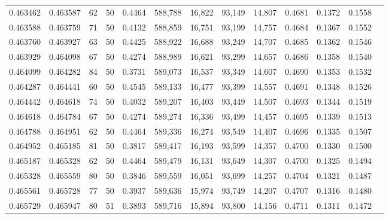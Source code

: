 \begin{tabular}{rrrrrrrrrrrrr}
0.463462 & 0.463587 &    62 &  50 &                                     0.4464 & 588,788 &  16,822 &  93,149 &  14,807 & 0.4681 & 0.1372 & 0.1558 \\
0.463588 & 0.463759 &    71 &  50 &                                     0.4132 & 588,859 &  16,751 &  93,199 &  14,757 & 0.4684 & 0.1367 & 0.1552 \\
0.463760 & 0.463927 &    63 &  50 &                                     0.4425 & 588,922 &  16,688 &  93,249 &  14,707 & 0.4685 & 0.1362 & 0.1546 \\
0.463929 & 0.464098 &    67 &  50 &                                     0.4274 & 588,989 &  16,621 &  93,299 &  14,657 & 0.4686 & 0.1358 & 0.1540 \\
0.464099 & 0.464282 &    84 &  50 &                                     0.3731 & 589,073 &  16,537 &  93,349 &  14,607 & 0.4690 & 0.1353 & 0.1532 \\
0.464287 & 0.464441 &    60 &  50 &                                     0.4545 & 589,133 &  16,477 &  93,399 &  14,557 & 0.4691 & 0.1348 & 0.1526 \\
0.464442 & 0.464618 &    74 &  50 &                                     0.4032 & 589,207 &  16,403 &  93,449 &  14,507 & 0.4693 & 0.1344 & 0.1519 \\
0.464618 & 0.464784 &    67 &  50 &                                     0.4274 & 589,274 &  16,336 &  93,499 &  14,457 & 0.4695 & 0.1339 & 0.1513 \\
0.464788 & 0.464951 &    62 &  50 &                                     0.4464 & 589,336 &  16,274 &  93,549 &  14,407 & 0.4696 & 0.1335 & 0.1507 \\
0.464952 & 0.465185 &    81 &  50 &                                     0.3817 & 589,417 &  16,193 &  93,599 &  14,357 & 0.4700 & 0.1330 & 0.1500 \\
0.465187 & 0.465328 &    62 &  50 &                                     0.4464 & 589,479 &  16,131 &  93,649 &  14,307 & 0.4700 & 0.1325 & 0.1494 \\
0.465328 & 0.465559 &    80 &  50 &                                     0.3846 & 589,559 &  16,051 &  93,699 &  14,257 & 0.4704 & 0.1321 & 0.1487 \\
0.465561 & 0.465728 &    77 &  50 &                                     0.3937 & 589,636 &  15,974 &  93,749 &  14,207 & 0.4707 & 0.1316 & 0.1480 \\
0.465729 & 0.465947 &    80 &  51 &                                     0.3893 & 589,716 &  15,894 &  93,800 &  14,156 & 0.4711 & 0.1311 & 0.1472 \\

\end{tabular}
